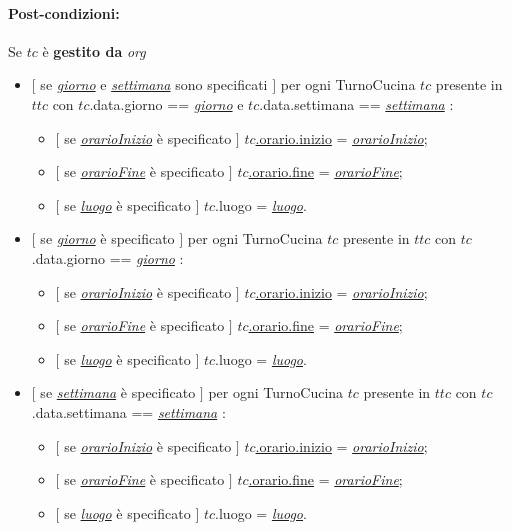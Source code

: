 {\paragraph{Post-condizioni:} Se $tc$ è \textbf{gestito da} {\textit{org}}
 \begin{itemize}
   \item $[$ se \underline{\textit{giorno}} e \underline{\textit{settimana}} sono specificati $]$ \textlangle per ogni TurnoCucina $tc$ presente in $ttc$ con $tc$.data.giorno == \underline{\textit{giorno}} e $tc$.data.settimana == \underline{\textit{settimana}} \textrangle:
\begin{itemize}
  \item $[$ se \underline{\textit{orarioInizio}} è specificato $]$ \underline{$tc$.orario.inizio} = \underline{\textit{orarioInizio}};
    \item $[$ se \underline{\textit{orarioFine}} è specificato $]$ \underline{$tc$.orario.fine} = \underline{\textit{orarioFine}};
  \item $[$ se \underline{\textit{luogo}} è specificato $]$ $tc$.luogo = \underline{\textit{luogo}}.
\end{itemize}
   \item $[$ se \underline{\textit{giorno}} è specificato $]$ \textlangle per ogni TurnoCucina $tc$ presente in $ttc$ con $tc$.data.giorno == \underline{\textit{giorno}} \textrangle:
\begin{itemize}
  \item $[$ se \underline{\textit{orarioInizio}} è specificato $]$ \underline{$tc$.orario.inizio} = \underline{\textit{orarioInizio}};
    \item $[$ se \underline{\textit{orarioFine}} è specificato $]$ \underline{$tc$.orario.fine} = \underline{\textit{orarioFine}};
  \item $[$ se \underline{\textit{luogo}} è specificato $]$ $tc$.luogo = \underline{\textit{luogo}}.
\end{itemize}
   \item $[$ se \underline{\textit{settimana}} è specificato $]$ \textlangle per ogni TurnoCucina $tc$ presente in $ttc$ con $tc$.data.settimana == \underline{\textit{settimana}} \textrangle:
\begin{itemize}
  \item $[$ se \underline{\textit{orarioInizio}} è specificato $]$ \underline{$tc$.orario.inizio} = \underline{\textit{orarioInizio}};
    \item $[$ se \underline{\textit{orarioFine}} è specificato $]$ \underline{$tc$.orario.fine} = \underline{\textit{orarioFine}};
  \item $[$ se \underline{\textit{luogo}} è specificato $]$ $tc$.luogo = \underline{\textit{luogo}}.
\end{itemize}


\end{itemize}}
